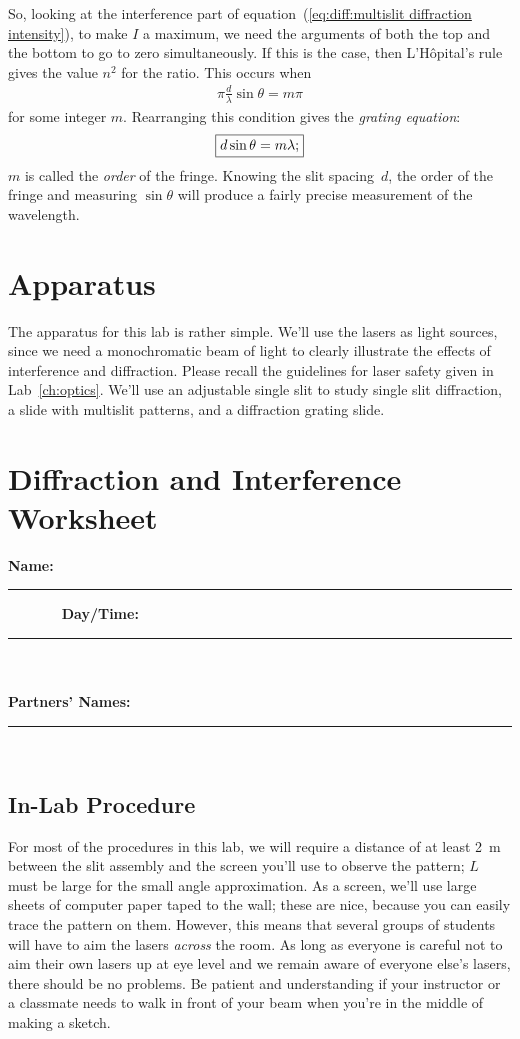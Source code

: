 So, looking at the interference part of 
equation~(\ref{eq:diff:multislit diffraction intensity}), to make $I$ a 
maximum, we need the arguments of both the top and the bottom to go to zero 
simultaneously. If this is the case, then L'H\^opital's rule gives the value 
$n^2$ for the ratio. This occurs when
\begin{eqnarray*}
\pi \frac{d}{\lambda} \sin \theta = m \pi
\end{eqnarray*}
for some integer $m$. Rearranging this condition gives the {\em grating
equation}:
\begin{eqnarray*}
\fbox{$ \displaystyle d \sin \theta = m \lambda; $}
\end{eqnarray*}
$m$ is called the {\em order} of the fringe. Knowing the slit spacing~$d$, the 
order of the fringe and measuring $\sin \theta$ will produce a fairly precise
measurement of the wavelength.

\section{Apparatus}

The apparatus for this lab is rather simple.  We'll use the lasers as light 
sources, since we need a monochromatic beam of light to clearly illustrate the
effects of interference and diffraction. Please recall the guidelines for 
laser safety given in Lab~\ref{ch:optics}. We'll use an adjustable single
slit to study single slit diffraction, a slide with multislit patterns, and
a diffraction grating slide.

\vfill
\pagebreak

\renewcommand{\thesection}{\thechapter.W}

\section{Diffraction and Interference Worksheet}
{\bf \Large Name:}~ \rule{5cm}{.1mm}~~~~~~~
{\bf \Large Day/Time:}~\rule{3cm}{.1mm}\\ 
\ \\
{\bf \large Partners' Names:}~\rule{6cm}{.1mm}\\

\subsection{In-Lab Procedure}

For most of the procedures in this lab, we will require a distance of at least
2~m between the slit assembly and the screen you'll use to observe the pattern;
$L$ must be large for the small angle approximation.  As a screen, we'll 
use large sheets of computer paper taped to the wall; these are nice, because 
you can easily trace the pattern on them.  However, this means that several 
groups of students will have to aim the lasers {\it across} the room.  As long
as everyone is careful not to aim their own lasers up at eye level and we 
remain aware of everyone else's lasers, there should be no problems.  Be 
patient and understanding if your instructor or a classmate needs to walk in
front of your beam when you're in the middle of making a sketch.
 
